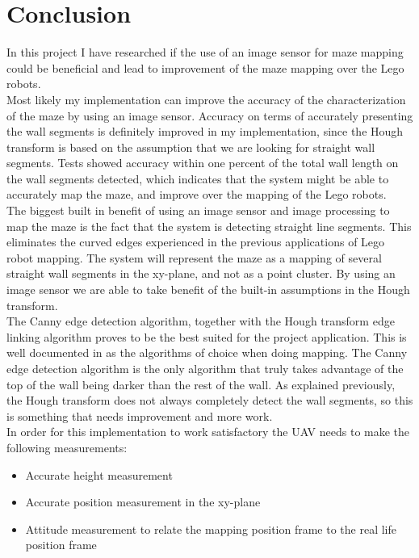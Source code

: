 \section{Conclusion}
In this project I have researched if the use of an image sensor for maze mapping could be beneficial and lead to improvement of the maze mapping over the Lego robots. \\

Most likely my implementation can improve the accuracy of the characterization of the maze by using an image sensor. Accuracy on terms of accurately presenting the wall segments is definitely improved in my implementation, since the Hough transform is based on the assumption that we are looking for straight wall segments. Tests showed accuracy within one percent of the total wall length on the wall segments detected, which indicates that the system might be able to accurately map the maze, and improve over the mapping of the Lego robots.\\

The biggest built in benefit of using an image sensor and image processing to map the maze is the fact that the system is detecting straight line segments. This eliminates the curved edges experienced in the previous applications of Lego robot mapping. The system will represent the maze as a mapping of several straight wall segments in the xy-plane, and not as a point cluster. By using an image sensor we are able to take benefit of the built-in assumptions in the Hough transform.\\

The Canny edge detection algorithm, together with the Hough transform edge linking algorithm proves to be the best suited for the project application. This is well documented in \cite{g} as the algorithms of choice when doing mapping. The Canny edge detection algorithm is the only algorithm that truly takes advantage of the top of the wall being darker than the rest of the wall. As explained previously, the Hough transform does not always completely detect the wall segments, so this is something that needs improvement and more work.\\

In order for this implementation to work satisfactory the UAV needs to make the following measurements:
\begin{itemize}
\item Accurate height measurement
\item Accurate position measurement in the xy-plane
\item Attitude measurement to relate the mapping position frame to the real life position frame
\end{itemize}


